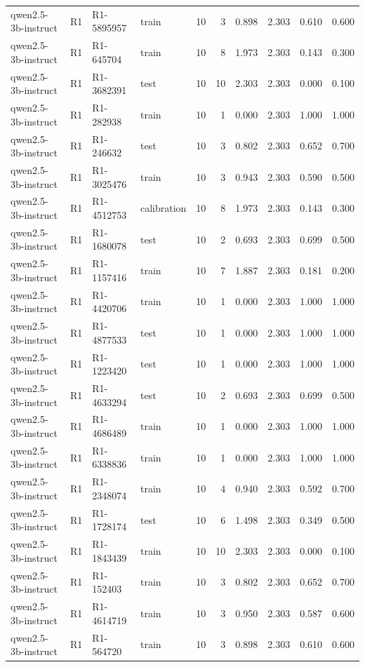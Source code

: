 \begin{table}
\begin{tabular}{llllrrrrrr}
qwen2.5-3b-instruct & R1 & R1-5895957 & train & 10 & 3 & 0.898 & 2.303 & 0.610 & 0.600 \\
qwen2.5-3b-instruct & R1 & R1-645704 & train & 10 & 8 & 1.973 & 2.303 & 0.143 & 0.300 \\
qwen2.5-3b-instruct & R1 & R1-3682391 & test & 10 & 10 & 2.303 & 2.303 & 0.000 & 0.100 \\
qwen2.5-3b-instruct & R1 & R1-282938 & train & 10 & 1 & 0.000 & 2.303 & 1.000 & 1.000 \\
qwen2.5-3b-instruct & R1 & R1-246632 & test & 10 & 3 & 0.802 & 2.303 & 0.652 & 0.700 \\
qwen2.5-3b-instruct & R1 & R1-3025476 & train & 10 & 3 & 0.943 & 2.303 & 0.590 & 0.500 \\
qwen2.5-3b-instruct & R1 & R1-4512753 & calibration & 10 & 8 & 1.973 & 2.303 & 0.143 & 0.300 \\
qwen2.5-3b-instruct & R1 & R1-1680078 & test & 10 & 2 & 0.693 & 2.303 & 0.699 & 0.500 \\
qwen2.5-3b-instruct & R1 & R1-1157416 & train & 10 & 7 & 1.887 & 2.303 & 0.181 & 0.200 \\
qwen2.5-3b-instruct & R1 & R1-4420706 & train & 10 & 1 & 0.000 & 2.303 & 1.000 & 1.000 \\
qwen2.5-3b-instruct & R1 & R1-4877533 & test & 10 & 1 & 0.000 & 2.303 & 1.000 & 1.000 \\
qwen2.5-3b-instruct & R1 & R1-1223420 & test & 10 & 1 & 0.000 & 2.303 & 1.000 & 1.000 \\
qwen2.5-3b-instruct & R1 & R1-4633294 & test & 10 & 2 & 0.693 & 2.303 & 0.699 & 0.500 \\
qwen2.5-3b-instruct & R1 & R1-4686489 & train & 10 & 1 & 0.000 & 2.303 & 1.000 & 1.000 \\
qwen2.5-3b-instruct & R1 & R1-6338836 & train & 10 & 1 & 0.000 & 2.303 & 1.000 & 1.000 \\
qwen2.5-3b-instruct & R1 & R1-2348074 & train & 10 & 4 & 0.940 & 2.303 & 0.592 & 0.700 \\
qwen2.5-3b-instruct & R1 & R1-1728174 & test & 10 & 6 & 1.498 & 2.303 & 0.349 & 0.500 \\
qwen2.5-3b-instruct & R1 & R1-1843439 & train & 10 & 10 & 2.303 & 2.303 & 0.000 & 0.100 \\
qwen2.5-3b-instruct & R1 & R1-152403 & train & 10 & 3 & 0.802 & 2.303 & 0.652 & 0.700 \\
qwen2.5-3b-instruct & R1 & R1-4614719 & train & 10 & 3 & 0.950 & 2.303 & 0.587 & 0.600 \\
qwen2.5-3b-instruct & R1 & R1-564720 & train & 10 & 3 & 0.898 & 2.303 & 0.610 & 0.600 \\

\end{tabular}
\end{table}
